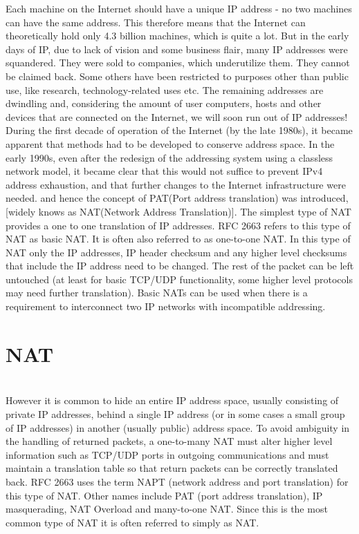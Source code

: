 \documentclass[12pt]{article}
\begin{document}
Each machine on the Internet should have a unique IP address - no two machines can have the same address. This therefore means that the Internet can theoretically hold only 4.3 billion machines, which is quite a lot. But in the early days of IP, due to lack of vision and some business flair, many IP addresses were squandered. They were sold to companies, which underutilize them. They cannot be claimed back. Some others have been restricted to purposes other than public use, like research, technology-related uses etc. The remaining addresses are dwindling and, considering the amount of user computers, hosts and other devices that are connected on the Internet, we will soon run out of IP addresses!
During the first decade of operation of the Internet (by the late 1980s), it became apparent that methods had to be developed to conserve address space. In the early 1990s, even after the redesign of the addressing system using a classless network model, it became clear that this would not suffice to prevent IPv4 address exhaustion, and that further changes to the Internet infrastructure were needed. and hence the concept of PAT(Port address translation) was introduced,[widely knows as NAT(Network Address Translation)]. The simplest type of NAT provides a one to one translation of IP addresses. RFC 2663 refers to this type of NAT as basic NAT. It is often also referred to as one-to-one NAT. In this type of NAT only the IP addresses, IP header checksum and any higher level checksums that include the IP address need to be changed. The rest of the packet can be left untouched (at least for basic TCP/UDP functionality, some higher level protocols may need further translation). Basic NATs can be used when there is a requirement to interconnect two IP networks with incompatible addressing.\\
\section{NAT}\\

However it is common to hide an entire IP address space, usually consisting of private IP addresses, behind a single IP address (or in some cases a small group of IP addresses) in another (usually public) address space. To avoid ambiguity in the handling of returned packets, a one-to-many NAT must alter higher level information such as TCP/UDP ports in outgoing communications and must maintain a translation table so that return packets can be correctly translated back. RFC 2663 uses the term NAPT (network address and port translation) for this type of NAT. Other names include PAT (port address translation), IP masquerading, NAT Overload and many-to-one NAT. Since this is the most common type of NAT it is often referred to simply as NAT.\\
\end{document}

